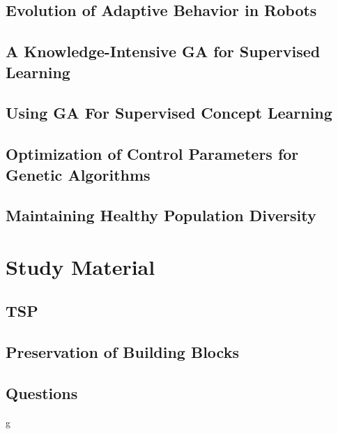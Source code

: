 \documentclass[10pt,twoside,openleft]{memoir}
\theoremstyle{definition}
\begin{document}
\chapter{Evolution of Adaptive Behavior in Robots}


\chapter{A Knowledge-Intensive GA for Supervised Learning}


\chapter{Using GA For Supervised Concept Learning}


\chapter{Optimization of Control Parameters for Genetic Algorithms}


\chapter{Maintaining Healthy Population Diversity}


\part{Study Material}

\chapter{TSP}


\chapter{Preservation of Building Blocks}


\chapter{Questions}
g

\backmatter
\appendix
\printbibliography
\end{document}

